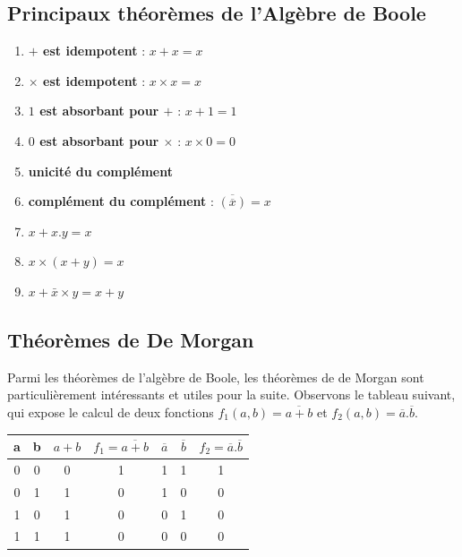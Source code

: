 \subsection{Principaux théorèmes de l'Algèbre de Boole}

\begin{enumerate}
\item {\bf $+$ est idempotent} : $x+x=x$
\item {\bf $\times$ est idempotent} : $x \times x=x$
\item {\bf $1$ est absorbant pour $+$} : $x+1=1$
\item {\bf $0$ est absorbant pour $\times$} : $x\times 0=0$
\item {\bf unicité du complément}
\item {\bf complément du complément} : $\overline{ ( \overline{x} ) }=x$
\item $x+x.y = x$
\item $x \times (x + y) = x$
\item $x + \bar{x} \times y = x +y$
\end{enumerate}

\subsection{Théorèmes de De Morgan}

Parmi les théorèmes de l'algèbre de Boole, les théorèmes de de Morgan sont particulièrement intéressants et utiles pour la suite.
Observons le tableau suivant, qui expose le calcul de deux fonctions $f_1(a,b)=\overline{a+b}$ et $f_2(a,b)=\overline{a}.\overline{b}$.

\begin{center}
   \begin{tabular}{|c|c|c|c|c|c|c| }
     \hline
     a & b & $a+b$ & $f_1=\overline{a+b}$ & $\overline{a}$ & $\overline{b}$ & $f_2=\overline{a}.\overline{b}$ \\ \hline \hline
     0 & 0 &     0 &                   1  &              1 &              1 &                              1  \\ \hline
     0 & 1 &     1 &                   0  &              1 &              0 &                              0  \\ \hline
     1 & 0 &     1 &                   0  &              0 &              1 &                              0  \\ \hline
     1 & 1 &     1 &                   0  &              0 &              0 &                              0  \\ \hline
   \end{tabular}
 \end{center}

